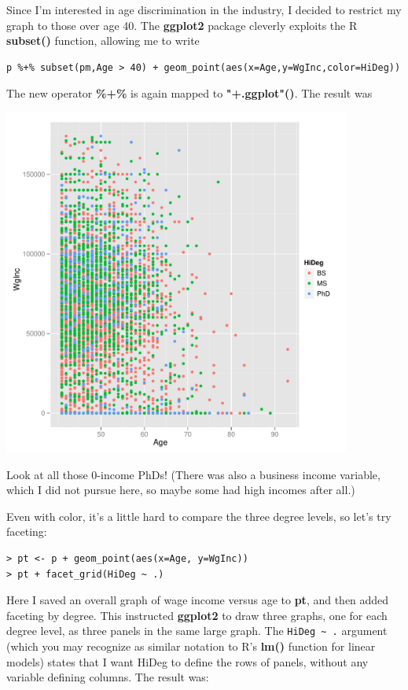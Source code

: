 Since I'm interested in age discrimination in the industry, I decided to
restrict my graph to those over age 40.  The {\bf ggplot2} package
cleverly exploits the R {\bf subset()} function, allowing me to write

\begin{lstlisting}
p %+% subset(pm,Age > 40) + geom_point(aes(x=Age,y=WgInc,color=HiDeg))
\end{lstlisting}

The new operator {\bf \%+\%} is again mapped to {\bf "+.ggplot"()}.  The
result was

\includegraphics[bb=0 0 504 504,width=4.5in]{40AgeIncColor.pdf}

Look at all those 0-income PhDs!  (There was also a business income
variable, which I did not pursue here, so maybe some had high incomes
after all.)

Even with color, it's a little hard to compare the three degree levels,
so let's try faceting:

\begin{lstlisting}
> pt <- p + geom_point(aes(x=Age, y=WgInc))
> pt + facet_grid(HiDeg ~ .)
\end{lstlisting}

Here I saved an overall graph of wage income versus age to {\bf pt}, and
then added faceting by degree.  This instructed {\bf ggplot2} to draw
three graphs, one for each degree level, as three panels in the same
large graph.  The \lstinline{HiDeg ~ .} argument (which you may
recognize as similar notation to R's {\bf lm()} function for linear
models) states that I want HiDeg to define the rows of panels, without
any variable defining columns.  The result was:

